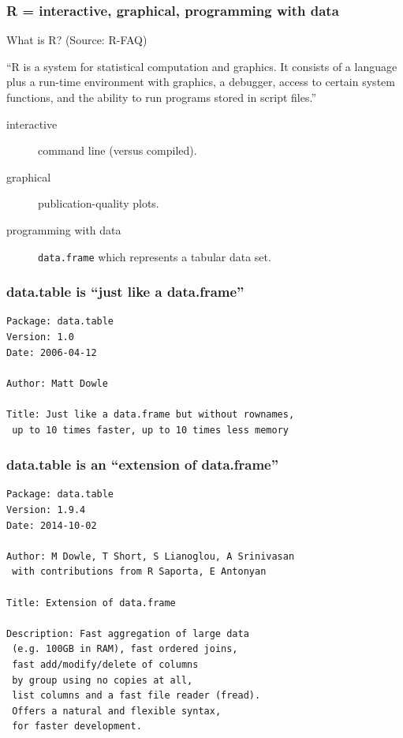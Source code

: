 \documentclass{beamer}
\begin{document}
\begin{frame}
  \frametitle{R = interactive, graphical, programming with data}
  
  What is R? (Source: R-FAQ)

  ``R is a system for statistical computation and graphics. It
  consists of a language plus a run-time environment with graphics, a
  debugger, access to certain system functions, and the ability to run
  programs stored in script files.'' 

  \begin{description}
  \item[interactive] command line (versus compiled).
  \item[graphical] publication-quality plots.
  \item[programming with data] \texttt{data.frame} which represents a
    tabular data set.
  \end{description}
\end{frame}

\begin{frame}[fragile]
  \frametitle{data.table is ``just like a data.frame''}

\begin{verbatim}
Package: data.table
Version: 1.0
Date: 2006-04-12

Author: Matt Dowle

Title: Just like a data.frame but without rownames, 
 up to 10 times faster, up to 10 times less memory

\end{verbatim}



\end{frame}

\begin{frame}[fragile]
  \frametitle{data.table is an ``extension of data.frame''}

\begin{verbatim}
Package: data.table
Version: 1.9.4
Date: 2014-10-02

Author: M Dowle, T Short, S Lianoglou, A Srinivasan 
 with contributions from R Saporta, E Antonyan

Title: Extension of data.frame

Description: Fast aggregation of large data
 (e.g. 100GB in RAM), fast ordered joins, 
 fast add/modify/delete of columns 
 by group using no copies at all, 
 list columns and a fast file reader (fread). 
 Offers a natural and flexible syntax, 
 for faster development.
\end{verbatim}

\end{frame}
\end{document}
